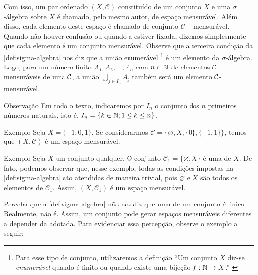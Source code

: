 Com isso, um par ordenado $(X, \mathcal{C})$  constituído de um conjunto $X$ e uma $\sigma$-álgebra sobre $X$ é chamado, pelo mesmo autor, de espaço mensurável.
Além disso, cada elemento deste espaço é chamado de conjunto $\mathcal{C}-$mensurável.
Quando não houver confusão ou quando a \sigal estiver fixada, dizemos simplesmente que cada elemento é um conjunto mensurável. 
Observe que a terceira condição da \ref{def:sigma-algebra} nos diz que a união enumerável
%
\footnote{Para esse tipo de conjunto, utilizaremos a definição \enquote{Um conjunto $X$ diz-se \textit{enumerável} quando é finito ou quando existe uma bijeção $f : \operatorname{\mathbb{N}} \to X$.} \cite[p.48]{elon}}
%
é um elemento da $\sigma$-álgebra.
Logo, para um número finito $A_1, A_2, ..., A_n$ com $n \in \operatorname{\mathbb{N}}$ de elementos $\operatorname{\mathcal{C}}$-mensuráveis de uma \sigal $\operatorname{\mathcal{C}}$, a união $\displaystyle \bigcup_{j \in I_n} A_j$ também será um elemento $\operatorname{\mathcal{C}}$-mensurável.

\begin{env}{Observação}
	Em todo o texto, indicaremos por $I_n$ o conjunto dos $n$ primeiros números naturais, isto é, $I_n = \{k \in \operatorname{\mathbb{N}}; 1 \leq k \leq n\}$.
\end{env}
\begin{env}{Exemplo}
	\label{ex:Primeiro Exemplo Sigma Algebra}
    Seja $X = \{-1,0,1\}$. Se considerarmos $\mathcal{C} = \{\varnothing, X, \{0\}, \{-1,1\}\}$, temos que $(X, \mathcal{C})$ é um espaço mensurável.
    \vspace{-0.2cm}
\end{env}
%
\begin{env}{Exemplo}
	\label{ex:sigma-trivial}
	Seja $X$ um conjunto qualquer.
	O conjunto $\mathcal{C}_1 = \{\varnothing, X\}$ é uma \sigal de $X$.
	De fato, podemos observar que, nesse exemplo, todas as condições impostas na  \ref{def:sigma-algebra} são atendidas de maneira trivial, pois 
	$\varnothing$ e $X$ são todos os elementos de $\mathcal{C}_1$. 
	Assim,  $(X, \mathcal{C}_1)$ é um espaço mensurável.
\vspace{-0.2cm}
\end{env}

	Perceba que a \ref{def:sigma-algebra} não nos diz que uma \sigal de um conjunto é única.
Realmente, não é. 
Assim, um conjunto pode gerar espaços mensuráveis diferentes a depender da \sigal adotada.
Para evidenciar essa percepção, observe o exemplo a seguir:

